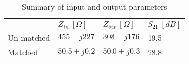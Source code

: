 \documentclass[report.tex]{subfiles}
\begin{document}
\begin{table}
    \centering
    \caption{Summary of input and output parameters}
    \begin{tabular}{l | l l l}
        & $Z_{in}~[\Omega]$ & $Z_{out}~[\Omega]$ & $S_{21}~[dB]$\\
        \hline
        Un-matched & $455-j227$  & $308-j176$  & 19.5 \\
        Matched    & $50.5+j0.2$ & $50.0+j0.3$ & 28.8 \\
    \end{tabular}
\end{table}

\clearpage
\end{document}
